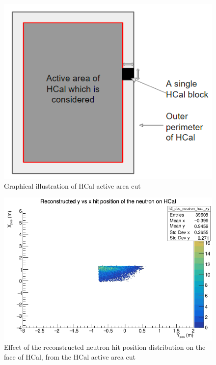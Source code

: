 \begin{figure}[h!]
    \centering
    \includegraphics[scale=0.7]{Images/sbs9_hydrogen_analysis/HCal_active_areaCut.png}
    \caption{Graphical illustration of HCal active area cut}
    \label{fig: HCal active area}
\end{figure}

\begin{figure}[h!]
    \centering
    \includegraphics[scale=0.75]{Images/sbs9_hydrogen_analysis/reconstructed_neutron_hitpos_onHCal.png}
    \caption{Effect of the reconstructed neutron hit position distribution on the face of HCal, from the HCal active area cut}
    \label{fig: Reconstructed neutron hit pos on HCal}
\end{figure}

